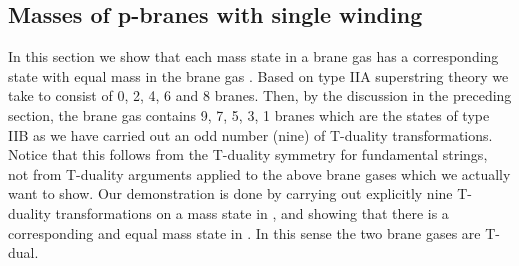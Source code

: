 \documentclass[a4paper,twocolumn,nofootinbib,tightenlines,prd,aps,
               superscriptaddress]{revtex4} %
\providecommand{\cB}{{\cal{B}}}
\begin{document}
\subsection{Masses of p-branes with single winding}

In this section we show that each mass state in a brane gas \myHighlight{$\cB$}\coordHE{}
has a corresponding state with equal mass in the brane gas
\myHighlight{$\cB^*$}\coordHE{}. Based on type IIA superstring theory we take \myHighlight{$\cB$}\coordHE{} to
consist of 0, 2, 4, 6 and 8 branes. Then, by the discussion in the
preceding section, the brane gas \myHighlight{$\cB^*$}\coordHE{} contains 9, 7, 5, 3, 1
branes which are the states of type IIB as we have carried out an
odd number (nine) of T-duality transformations. Notice that this
follows from the T-duality symmetry for fundamental strings, not
from T-duality arguments applied to
the above brane gases which we actually want to show.
Our demonstration is
done by carrying out explicitly nine T-duality transformations on
a mass state in \myHighlight{$\cB$}\coordHE{}, and showing that there is a corresponding
and equal mass state in \myHighlight{$\cB^*$}\coordHE{}. In this sense the two  brane
gases are T-dual.
\end{document}

